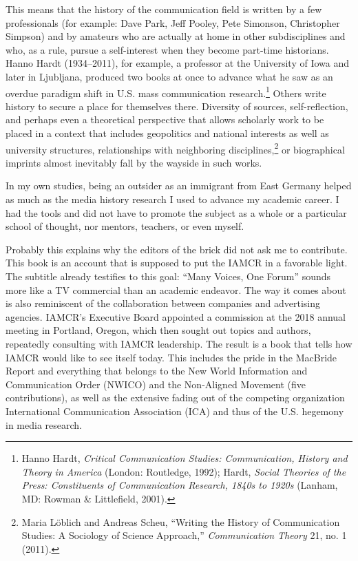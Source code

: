 \documentclass{tufte-handout}
\begin{document}
This means that the history of the communication field is written by a
few professionals (for example: Dave Park, Jeff Pooley, Pete Simonson,
Christopher Simpson) and by amateurs who are actually at home in other
subdisciplines and who, as a rule, pursue a self-interest when they
become part-time historians. Hanno Hardt (1934--2011), for example, a
professor at the University of Iowa and later in Ljubljana, produced two
books at once to advance what he saw as an overdue paradigm shift in
U.S. mass communication research.\footnote{Hanno Hardt, \emph{Critical
  Communication Studies: Communication, History and Theory in America}
  (London: Routledge, 1992); Hardt, \emph{Social Theories of the Press:
  Constituents of Communication Research, 1840s to 1920s} (Lanham, MD:
  Rowman \& Littlefield, 2001).} Others write history to secure a place
for themselves there. Diversity of sources, self-reflection, and perhaps
even a theoretical perspective that allows scholarly work to be placed
in a context that includes geopolitics and national interests as well as
university structures, relationships with neighboring
disciplines,\footnote{Maria Löblich and Andreas Scheu, ``Writing the
  History of Communication Studies: A Sociology of Science Approach,''
  \emph{Communication Theory} 21, no. 1 (2011).} or biographical
imprints almost inevitably fall by the wayside in such works.

In my own studies, being an outsider as an immigrant from East Germany
helped as much as the media history research I used to advance my
academic career. I had the tools and did not have to promote the subject
as a whole or a particular school of thought, nor mentors, teachers, or
even myself.

Probably this explains why the editors of the brick did not ask me to
contribute. This book is an account that is supposed to put the IAMCR in
a favorable light. The subtitle already testifies to this goal: ``Many
Voices, One Forum'' sounds more like a TV commercial than an academic
endeavor. The way it comes about is also reminiscent of the
collaboration between companies and advertising agencies. IAMCR's
Executive Board appointed a commission at the 2018 annual meeting in
Portland, Oregon, which then sought out topics and authors, repeatedly
consulting with IAMCR leadership. The result is a book that tells how
IAMCR would like to see itself today. This includes the pride in the
MacBride Report and everything that belongs to the New World Information
and Communication Order (NWICO) and the Non-Aligned Movement (five
contributions), as well as the extensive fading out of the competing
organization International Communication Association (ICA) and thus of
the U.S. hegemony in media research.
\end{document}
